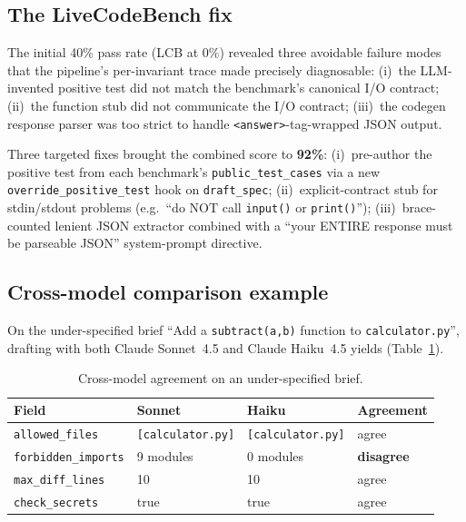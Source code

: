 \documentclass{article}
\begin{document}
\subsection{The LiveCodeBench fix}\label{sec:lcb-fix}

The initial 40\% pass rate (LCB at 0\%) revealed three avoidable failure modes that the pipeline's per-invariant trace made precisely diagnosable: (i)~the LLM-invented positive test did not match the benchmark's canonical I/O contract; (ii)~the function stub did not communicate the I/O contract; (iii)~the codegen response parser was too strict to handle \texttt{<answer>}-tag-wrapped JSON output.

Three targeted fixes brought the combined score to \textbf{92\%}: (i)~pre-author the positive test from each benchmark's \texttt{public\_test\_cases} via a new \texttt{override\_positive\_test} hook on \texttt{draft\_spec}; (ii)~explicit-contract stub for stdin/stdout problems (e.g.\ ``do NOT call \texttt{input()} or \texttt{print()}''); (iii)~brace-counted lenient JSON extractor combined with a ``your ENTIRE response must be parseable JSON'' system-prompt directive.

\subsection{Cross-model comparison example}

On the under-specified brief ``Add a \texttt{subtract(a,b)} function to \texttt{calculator.py}'', drafting with both Claude Sonnet~4.5 and Claude Haiku~4.5 yields (Table~\ref{tab:crossmodel}).

\begin{table}[ht]
\centering
\caption{Cross-model agreement on an under-specified brief.}
\label{tab:crossmodel}
\begin{tabular}{llll}
\toprule
Field & Sonnet & Haiku & Agreement \\
\midrule
\texttt{allowed\_files}      & \texttt{[calculator.py]} & \texttt{[calculator.py]} & agree \\
\texttt{forbidden\_imports}  & 9 modules                & 0 modules                & \textbf{disagree} \\
\texttt{max\_diff\_lines}    & 10                       & 10                       & agree \\
\texttt{check\_secrets}      & true                     & true                     & agree \\
\bottomrule
\end{tabular}
\end{table}
\end{document}
